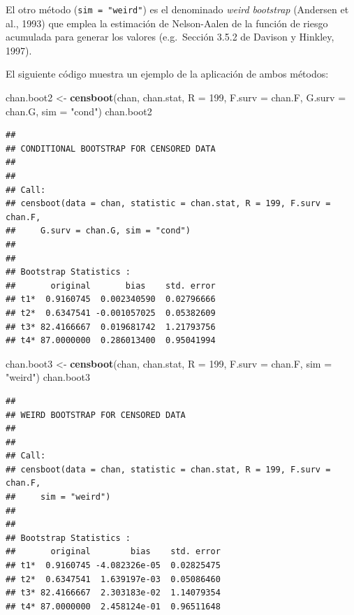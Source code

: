 \documentclass[
]{book}
\newenvironment{Shaded}{\begin{snugshade}}{\end{snugshade}}
\newcommand{\AttributeTok}[1]{\textcolor[rgb]{0.13,0.29,0.53}{#1}}
\newcommand{\DecValTok}[1]{\textcolor[rgb]{0.00,0.00,0.81}{#1}}
\newcommand{\FunctionTok}[1]{\textcolor[rgb]{0.13,0.29,0.53}{\textbf{#1}}}
\newcommand{\NormalTok}[1]{#1}
\newcommand{\OtherTok}[1]{\textcolor[rgb]{0.56,0.35,0.01}{#1}}
\newcommand{\StringTok}[1]{\textcolor[rgb]{0.31,0.60,0.02}{#1}}
\theoremstyle{break}
\theoremstyle{nonumberplain}
\begin{document}
El otro método (\texttt{sim\ =\ "weird"}) es el denominado \emph{weird bootstrap}
(Andersen et al., 1993) que emplea la estimación de Nelson-Aalen de la
función de riesgo acumulada para generar los valores
(e.g.~Sección 3.5.2 de Davison y Hinkley, 1997).

El siguiente código muestra un ejemplo de la aplicación de ambos métodos:

\begin{Shaded}
\begin{Highlighting}[]
\NormalTok{chan.boot2 }\OtherTok{\textless{}{-}} \FunctionTok{censboot}\NormalTok{(chan, chan.stat, }\AttributeTok{R =} \DecValTok{199}\NormalTok{, }\AttributeTok{F.surv =}\NormalTok{ chan.F, }
                  \AttributeTok{G.surv =}\NormalTok{ chan.G, }\AttributeTok{sim =} \StringTok{"cond"}\NormalTok{)}
\NormalTok{chan.boot2}
\end{Highlighting}
\end{Shaded}

\begin{verbatim}
## 
## CONDITIONAL BOOTSTRAP FOR CENSORED DATA
## 
## 
## Call:
## censboot(data = chan, statistic = chan.stat, R = 199, F.surv = chan.F, 
##     G.surv = chan.G, sim = "cond")
## 
## 
## Bootstrap Statistics :
##       original       bias    std. error
## t1*  0.9160745  0.002340590  0.02796666
## t2*  0.6347541 -0.001057025  0.05382609
## t3* 82.4166667  0.019681742  1.21793756
## t4* 87.0000000  0.286013400  0.95041994
\end{verbatim}

\begin{Shaded}
\begin{Highlighting}[]
\NormalTok{chan.boot3 }\OtherTok{\textless{}{-}} \FunctionTok{censboot}\NormalTok{(chan, chan.stat, }\AttributeTok{R =} \DecValTok{199}\NormalTok{, }\AttributeTok{F.surv =}\NormalTok{ chan.F, }
                  \AttributeTok{sim =} \StringTok{"weird"}\NormalTok{)}
\NormalTok{chan.boot3}
\end{Highlighting}
\end{Shaded}

\begin{verbatim}
## 
## WEIRD BOOTSTRAP FOR CENSORED DATA
## 
## 
## Call:
## censboot(data = chan, statistic = chan.stat, R = 199, F.surv = chan.F, 
##     sim = "weird")
## 
## 
## Bootstrap Statistics :
##       original        bias    std. error
## t1*  0.9160745 -4.082326e-05  0.02825475
## t2*  0.6347541  1.639197e-03  0.05086460
## t3* 82.4166667  2.303183e-02  1.14079354
## t4* 87.0000000  2.458124e-01  0.96511648
\end{verbatim}
\end{document}
